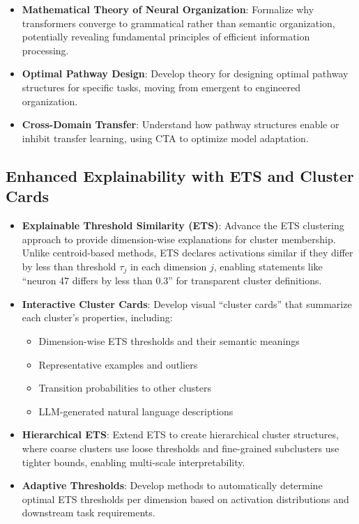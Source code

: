 \begin{itemize}
    \item \textbf{Mathematical Theory of Neural Organization}: Formalize why transformers converge to grammatical rather than semantic organization, potentially revealing fundamental principles of efficient information processing.
    
    \item \textbf{Optimal Pathway Design}: Develop theory for designing optimal pathway structures for specific tasks, moving from emergent to engineered organization.
    
    \item \textbf{Cross-Domain Transfer}: Understand how pathway structures enable or inhibit transfer learning, using CTA to optimize model adaptation.
\end{itemize}

\subsection{Enhanced Explainability with ETS and Cluster Cards}

\begin{itemize}
    \item \textbf{Explainable Threshold Similarity (ETS)}: Advance the ETS clustering approach \citep{kovalerchuk2024} to provide dimension-wise explanations for cluster membership. Unlike centroid-based methods, ETS declares activations similar if they differ by less than threshold $\tau_j$ in each dimension $j$, enabling statements like ``neuron 47 differs by less than 0.3'' for transparent cluster definitions.
    
    \item \textbf{Interactive Cluster Cards}: Develop visual ``cluster cards'' that summarize each cluster's properties, including:
    \begin{itemize}
        \item Dimension-wise ETS thresholds and their semantic meanings
        \item Representative examples and outliers
        \item Transition probabilities to other clusters
        \item LLM-generated natural language descriptions
    \end{itemize}
    
    \item \textbf{Hierarchical ETS}: Extend ETS to create hierarchical cluster structures, where coarse clusters use loose thresholds and fine-grained subclusters use tighter bounds, enabling multi-scale interpretability.
    
    \item \textbf{Adaptive Thresholds}: Develop methods to automatically determine optimal ETS thresholds per dimension based on activation distributions and downstream task requirements.
\end{itemize}

